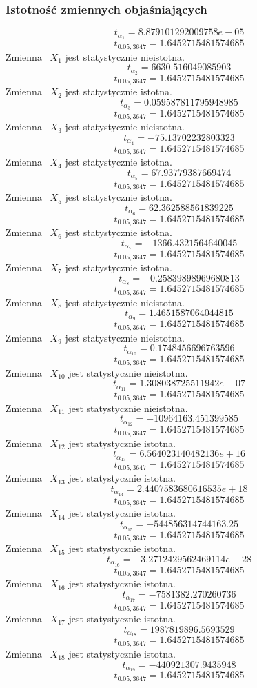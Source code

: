 \documentclass{article}
\begin{document}
\subsubsection{Istotność zmiennych objaśniających}
\[t_{\alpha_{1}} = 8.879101292009758e-05\]
\[t_{0.05, 3647} = 1.6452715481574685\]
Zmienna ~$X_{1}$ jest statystycznie nieistotna.
\[t_{\alpha_{2}} = 6630.516049085903\]
\[t_{0.05, 3647} = 1.6452715481574685\]
Zmienna ~$X_{2}$ jest statystycznie istotna.
\[t_{\alpha_{3}} = 0.059587811795948985\]
\[t_{0.05, 3647} = 1.6452715481574685\]
Zmienna ~$X_{3}$ jest statystycznie nieistotna.
\[t_{\alpha_{4}} = -75.13702232803323\]
\[t_{0.05, 3647} = 1.6452715481574685\]
Zmienna ~$X_{4}$ jest statystycznie istotna.
\[t_{\alpha_{5}} = 67.93779387669474\]
\[t_{0.05, 3647} = 1.6452715481574685\]
Zmienna ~$X_{5}$ jest statystycznie istotna.
\[t_{\alpha_{6}} = 62.362588561839225\]
\[t_{0.05, 3647} = 1.6452715481574685\]
Zmienna ~$X_{6}$ jest statystycznie istotna.
\[t_{\alpha_{7}} = -1366.4321564640045\]
\[t_{0.05, 3647} = 1.6452715481574685\]
Zmienna ~$X_{7}$ jest statystycznie istotna.
\[t_{\alpha_{8}} = -0.25839898969680813\]
\[t_{0.05, 3647} = 1.6452715481574685\]
Zmienna ~$X_{8}$ jest statystycznie nieistotna.
\[t_{\alpha_{9}} = 1.4651587064044815\]
\[t_{0.05, 3647} = 1.6452715481574685\]
Zmienna ~$X_{9}$ jest statystycznie nieistotna.
\[t_{\alpha_{10}} = 0.1748456696763596\]
\[t_{0.05, 3647} = 1.6452715481574685\]
Zmienna ~$X_{10}$ jest statystycznie nieistotna.
\[t_{\alpha_{11}} = 1.308038725511942e-07\]
\[t_{0.05, 3647} = 1.6452715481574685\]
Zmienna ~$X_{11}$ jest statystycznie nieistotna.
\[t_{\alpha_{12}} = -10964163.451399585\]
\[t_{0.05, 3647} = 1.6452715481574685\]
Zmienna ~$X_{12}$ jest statystycznie istotna.
\[t_{\alpha_{13}} = 6.564023140482136e+16\]
\[t_{0.05, 3647} = 1.6452715481574685\]
Zmienna ~$X_{13}$ jest statystycznie istotna.
\[t_{\alpha_{14}} = 2.4407583680616535e+18\]
\[t_{0.05, 3647} = 1.6452715481574685\]
Zmienna ~$X_{14}$ jest statystycznie istotna.
\[t_{\alpha_{15}} = -544856314744163.25\]
\[t_{0.05, 3647} = 1.6452715481574685\]
Zmienna ~$X_{15}$ jest statystycznie istotna.
\[t_{\alpha_{16}} = -3.2712429562469114e+28\]
\[t_{0.05, 3647} = 1.6452715481574685\]
Zmienna ~$X_{16}$ jest statystycznie istotna.
\[t_{\alpha_{17}} = -7581382.270260736\]
\[t_{0.05, 3647} = 1.6452715481574685\]
Zmienna ~$X_{17}$ jest statystycznie istotna.
\[t_{\alpha_{18}} = 1987819896.5693529\]
\[t_{0.05, 3647} = 1.6452715481574685\]
Zmienna ~$X_{18}$ jest statystycznie istotna.
\[t_{\alpha_{19}} = -440921307.9435948\]
\[t_{0.05, 3647} = 1.6452715481574685\]
\end{document}
